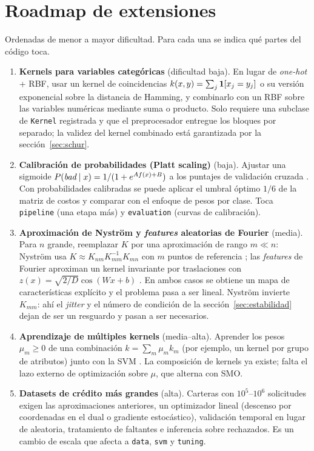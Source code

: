 \documentclass[11pt,a4paper]{article}
\newcommand{\bad}{\emph{bad}}
\newcommand{\code}[1]{\texttt{#1}}
\theoremstyle{plain}
\theoremstyle{definition}
\theoremstyle{remark}
\numberwithin{equation}{section}
\begin{document}
\section{Roadmap de extensiones}\label{sec:roadmap}

Ordenadas de menor a mayor dificultad. Para cada una se indica qué partes del código toca.

\begin{enumerate}
  \item \textbf{Kernels para variables categóricas} (dificultad baja). En lugar de
        \emph{one-hot} + RBF, usar un kernel de coincidencias
        $k(x,y)=\sum_j \mathbf{1}[x_j=y_j]$ o su versión exponencial sobre la distancia de
        Hamming, y combinarlo con un RBF sobre las variables numéricas mediante suma o
        producto. Solo requiere una subclase de \code{Kernel} registrada y que el
        preprocesador entregue los bloques por separado; la validez del kernel combinado
        está garantizada por la sección~\ref{sec:schur}.
  \item \textbf{Calibración de probabilidades (Platt scaling)} (baja). Ajustar una sigmoide
        $P(\bad\mid x)=1/(1+e^{Af(x)+B})$ a los puntajes de validación cruzada
        \cite{platt1999}. Con probabilidades calibradas se puede aplicar el umbral óptimo
        $1/6$ de la matriz de costos y comparar con el enfoque de pesos por clase. Toca
        \code{pipeline} (una etapa más) y \code{evaluation} (curvas de calibración).
  \item \textbf{Aproximación de Nyström y \emph{features} aleatorias de Fourier} (media).
        Para $n$ grande, reemplazar $K$ por una aproximación de rango $m\ll n$:
        Nyström usa $K\approx K_{nm}K_{mm}^{-1}K_{mn}$ con $m$ puntos de referencia
        \cite{williams2001}; las \emph{features} de Fourier aproximan un kernel invariante
        por traslaciones con $z(x)=\sqrt{2/D}\cos(Wx+b)$ \cite{rahimi2007}. En ambos casos
        se obtiene un mapa de características explícito y el problema pasa a ser lineal.
        Nyström invierte $K_{mm}$: ahí el \emph{jitter} y el número de condición de la
        sección~\ref{sec:estabilidad} dejan de ser un resguardo y pasan a ser necesarios.
  \item \textbf{Aprendizaje de múltiples kernels} (media--alta). Aprender los pesos
        $\mu_m\ge0$ de una combinación $k=\sum_m\mu_m k_m$ (por ejemplo, un kernel por grupo
        de atributos) junto con la SVM \cite{lanckriet2004,rakotomamonjy2008}. La
        composición de kernels ya existe; falta el lazo externo de optimización sobre
        $\mu$, que alterna con SMO.
  \item \textbf{Datasets de crédito más grandes} (alta). Carteras con $10^5$--$10^6$
        solicitudes exigen las aproximaciones anteriores, un optimizador lineal (descenso
        por coordenadas en el dual o gradiente estocástico), validación temporal en lugar de
        aleatoria, tratamiento de faltantes e inferencia sobre rechazados. Es un cambio de
        escala que afecta a \code{data}, \code{svm} y \code{tuning}.
\end{enumerate}
\end{document}
